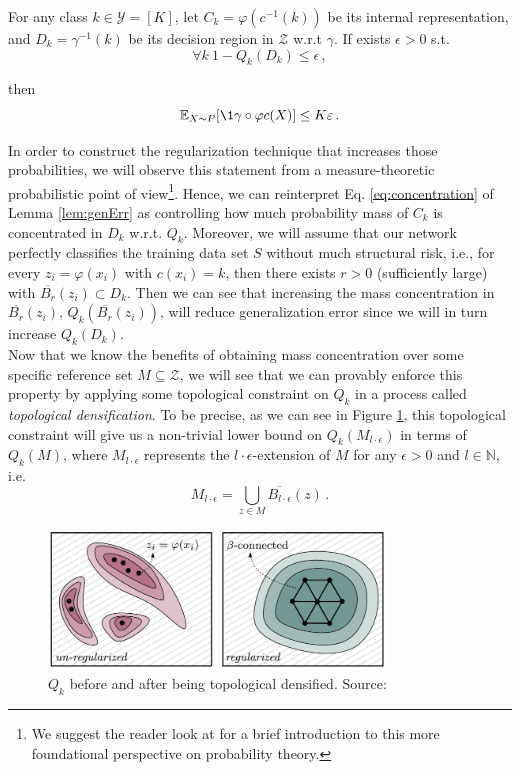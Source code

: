 \documentclass[../main.tex]{subfiles}
\begin{document}
\begin{lemma}
\label{lem:genErr}
For any class $k\in \mathcal{Y} = [K]$, let $C_k=\varphi(c^{-1}(k))$ be its internal representation, and $D_k= \gamma^{-1}(k)$ be its decision region in $\mathcal{Z}$ w.r.t $\gamma$. If exists $\epsilon >0$ s.t.
\begin{equation}
\label{eq:concentration}
 \forall k\ 1-Q_k(D_k) \leq \epsilon\,,   
\end{equation}

then 
\[
\E_{X \sim P}[\1{\gamma \circ \varphi}{c}(X)] \leq K\epsilon\,. 
\]
\end{lemma}

In order to construct the regularization technique that increases those probabilities, we will observe this statement from a measure-theoretic probabilistic point of view\footnote{We suggest the reader look at \cite[Appendix ~ B]{schervish_theory_1995} for a brief introduction to this more foundational perspective on probability theory.}. Hence, we can reinterpret Eq. \ref{eq:concentration} of Lemma \ref{lem:genErr} as controlling how much probability mass of $C_k$ is concentrated in $D_k$ w.r.t. $Q_k$. Moreover, we will assume that our network perfectly classifies the training data set $S$ without much structural risk, i.e., for every $z_i=\varphi(x_i)$ with $c(x_i)=k$, then there exists $r>0$ (sufficiently large) with $\overline{B_r}(z_i)\subset D_k$. Then we can see that increasing the mass concentration in $\overline{B_r}(z_i)$, $Q_k(\overline{B_r}(z_i))$, will reduce generalization error since we will in turn increase $Q_k(D_k)$.\\

Now that we know the benefits of obtaining mass concentration over some specific reference set $M \subseteq \mathcal{Z}$, we will see that we can provably enforce this property by applying some topological constraint on $Q_k$ in a process called \emph{topological densification}. To be precise, as we can see in Figure \ref{fig:densiScheme}, this topological constraint will give us a non-trivial lower bound on $Q_k(M_{l\cdot \epsilon})$ in terms of $Q_k(M)$, where $M_{l\cdot \epsilon}$ represents the $l\cdot \epsilon$-extension of $M$ for any $\epsilon>0$ and $l\in \mathbb{N}$, i.e.
\[
M_{l\cdot \epsilon} = \bigcup_{z\in M} \overline{B_{l\cdot \epsilon}}(z)\,.
\]

\begin{figure}[!ht]
    \centering
    \includegraphics[width=0.8\textwidth]{figures/bg/densification.png} 
    \caption{$Q_k$ before and after being topological densified. Source: \cite{hofer_densified_2021}}
    \label{fig:densiScheme}
\end{figure}
\end{document}
